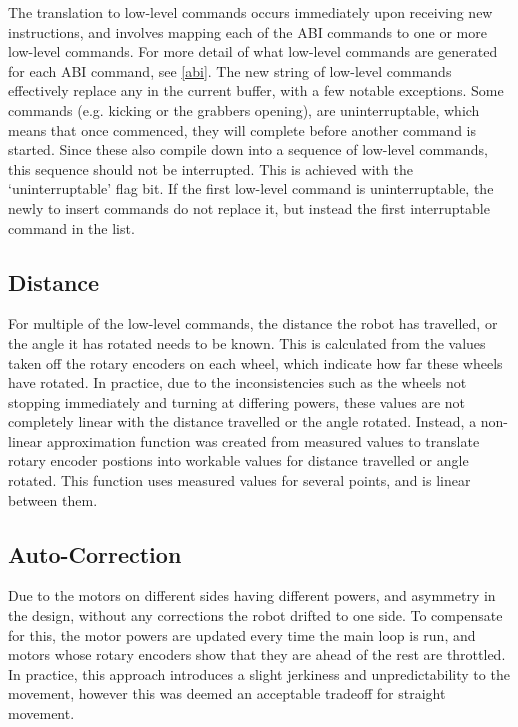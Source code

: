 The translation to low-level commands occurs immediately upon receiving new
instructions, and involves mapping each of the ABI commands to one or more
low-level commands. For more detail of what low-level commands are generated
for each ABI command, see \cref{abi}. The new string of low-level commands
effectively replace any in the current buffer, with a few notable exceptions.
Some commands (e.g. kicking or the grabbers opening), are uninterruptable,
which means that once commenced, they will complete before another command is
started. Since these also compile down into a sequence of low-level commands,
this sequence should not be interrupted. This is achieved with the
`uninterruptable' flag bit. If the first low-level command is uninterruptable,
the newly to insert commands do not replace it, but instead the first
interruptable command in the list.

\subsection{Distance}

For multiple of the low-level commands, the distance the robot has travelled,
or the angle it has rotated needs to be known. This is calculated from the
values taken off the rotary encoders on each wheel, which indicate how far
these wheels have rotated. In practice, due to the inconsistencies such as the
wheels not stopping immediately and turning at differing powers, these values
are not completely linear with the distance travelled or the angle rotated.
Instead, a non-linear approximation function was created from measured values
to translate rotary encoder postions into workable values for distance
travelled or angle rotated. This function uses measured values for several
points, and is linear between them.

\subsection{Auto-Correction}

Due to the motors on different sides having different powers, and asymmetry in
the design, without any corrections the robot drifted to one side. To
compensate for this, the motor powers are updated every time the main loop is
run, and motors whose rotary encoders show that they are ahead of the rest are
throttled. In practice, this approach introduces a slight jerkiness and
unpredictability to the movement, however this was deemed an acceptable
tradeoff for straight movement.
